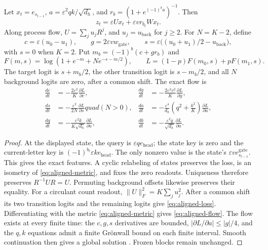 \begin{lemma}
\label{lem:aligned-reduction}
Let $x_t=e_{s_{t-1}}$, $a=\varepsilon^2qk/\sqrt{d_h}$, and
$r_b=(1+e^{(-1)^ba})^{-1}$. Then
\[
 z_t=\varepsilon Ux_t+\varepsilon v r_{b_t}Wx_t.
\]
Along process flow, $U=\sum_j u_jR^j$, and $u_j=u_{\mathrm{back}}$ for $j\ge2$.
For $N=K-2$, define
\[
 c=\varepsilon(u_0-u_1),\qquad g=2\varepsilon v w_{\mathrm{gate}},\qquad
 s=\varepsilon\bigl((u_0+u_1)/2-u_{\mathrm{back}}\bigr),
\]
with $s=0$ when $K=2$. Put $m_b=(-1)^b(c+gr_b)$ and
\begin{equation}
 F(m,s)=\log(1+e^{-m}+Ne^{-s-m/2}),\qquad
 L=(1-p)F(m_0,s)+pF(m_1,s).
 \label{eq:aligned-loss}
\end{equation}
The target logit is $s+m_b/2$, the other transition logit is $s-m_b/2$, and
all $N$ background logits are zero, after a common shift. The exact flow is
\begin{equation}
\begin{aligned}
 \frac{dc}{dt}&=-\frac{2\varepsilon^2}{K}\frac{\partial L}{\partial c},&
 \frac{dg}{dt}&=-\frac{2\varepsilon^2v^2}{K}\frac{\partial L}{\partial g},\\
 \frac{ds}{dt}&=-\frac{\varepsilon^2}{2N}\frac{\partial L}{\partial s}quad(N>0),&
 \frac{da}{dt}&=-\frac{\varepsilon^4}{d_h}
       \left(q^2+\frac{k^2}{K}\right)\frac{\partial L}{\partial a},\\
 \frac{dq}{dt}&=-\frac{\varepsilon^2k}{K\sqrt{d_h}}\frac{\partial L}{\partial a},&
 \frac{dk}{dt}&=-\frac{\varepsilon^2q}{\sqrt{d_h}}\frac{\partial L}{\partial a}.
\end{aligned}
\label{eq:aligned-flow}
\end{equation}
\end{lemma}
\begin{proof}
At the displayed state, the query is $\varepsilon q e_{\mathrm{head}}$;
the state key is zero and the current-letter key is
$(-1)^{b_t}\varepsilon k e_{\mathrm{head}}$.
The only nonzero value is the state's $\varepsilon v e_{s_{t-1}}^{\mathrm{gate}}$.
This gives the exact features. A cyclic relabeling of states preserves the loss,
is an isometry of \cref{eq:aligned-metric}, and fixes the zero readouts.
Uniqueness therefore preserves $R^{-1}UR=U$. Permuting background offsets
likewise preserves their equality.
For a circulant count readout, $\|U\|_F^2=K\sum_j u_j^2$.
After a common shift its two transition logits and the remaining logits give
\cref{eq:aligned-loss}. Differentiating with the metric
\cref{eq:aligned-metric} gives \cref{eq:aligned-flow}.
The flow exists at every finite time: the $c,g,s$ derivatives are bounded,
$|\partial L/\partial a|\le|g|/4$, and the $q,k$ equations admit a finite
Gr\"onwall bound on each finite interval. Smooth continuation then gives a global
solution \citep[Corollary~2.15]{teschl2012ode}. Frozen blocks remain unchanged.
\end{proof}

